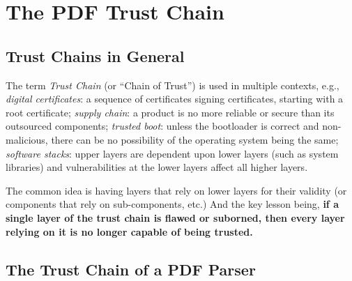 \section{The PDF Trust Chain }
\label{sec:trust-chain}

\subsection{Trust Chains in General}
The term \emph{Trust Chain} (or ``Chain of Trust'') is used in multiple contexts, e.g.,
\emph{digital certificates}: a sequence of certificates signing certificates,
starting with a root certificate;
\emph{supply chain}: a product is no more reliable or secure than its
outsourced components;
\emph{trusted boot}: unless the bootloader is correct and non-malicious,
there can be no possibility of the operating system being the same;
\emph{software stacks}: upper layers are dependent upon lower layers (such as
system libraries) and vulnerabilities at the lower layers affect all higher layers.

The common idea is having layers
that rely on lower layers for their validity
(or components that rely on sub-components, etc.)
And the key lesson being,
{\bf{if a single layer of the trust chain 
  is flawed or suborned, then every layer relying on it
  is no longer capable of being trusted.}}


\subsection{The Trust Chain of a PDF Parser}


